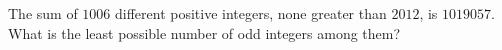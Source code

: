 The sum of $1006$ different positive integers, none greater than $2012$, is $1019057$. What is the least possible number of odd integers among them?
